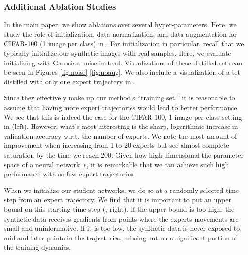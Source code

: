 \documentclass[main.tex]{subfiles}
\begin{document}


\subsubsection{Additional Ablation Studies}


In the main paper, we show ablations over several hyper-parameters. Here, we study the role of initialization, data normalization, and data augmentation for CIFAR-100 (1 image per class) in . For initialization in particular, recall that we typically initialize our synthetic images with real samples. Here, we evaluate initializing with Gaussian noise instead. Visualizations of these distilled sets can be seen in Figures \ref{fig:noise}-\ref{fig:noaug}. We also include a visualization of a set distilled with only one expert trajectory in .





Since they effectively make up our method's ``training set,'' it is reasonable to assume that having more expert trajectories would lead to better performance. We see that this is indeed the case for the CIFAR-100, 1 image per class setting in  (left). However, what's most interesting is the sharp, logarithmic increase in validation accuracy w.r.t. the number of experts. We note the most amount of improvement when increasing from  1 to 20 experts but see almost complete saturation by the time we reach 200. Given how high-dimensional the parameter space of a neural network is, it is remarkable that we can achieve such high performance with so few expert trajectories. \vspace{10pt}

When we initialize our student networks, we do so at a randomly selected time-step from an expert trajectory. We find that it is important to put an upper bound on this starting time-step (, right). If the upper bound is too high, the synthetic data receives gradients from points where the experts movements are small and uninformative. If it is too low, the synthetic data is never exposed to mid and later points in the trajectories, missing out on a significant portion of the training dynamics.
\end{document}
